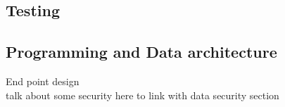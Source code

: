 \subsection{Testing}

\subsection{Programming and Data architecture}
End point design
\\talk about some security here to link with data security section
